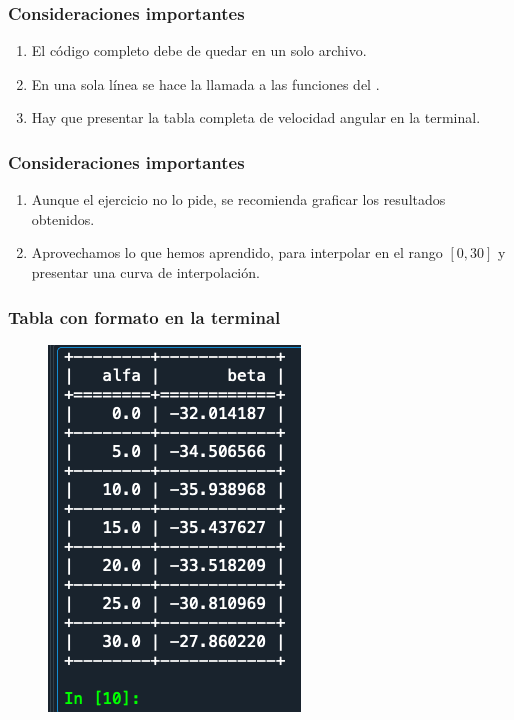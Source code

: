 \documentclass[12pt]{beamer}
\begin{document}
\begin{frame}
\frametitle{Consideraciones importantes}
\begin{enumerate}[<+->]
\conti
\item El código completo debe de quedar en un solo archivo.
\item En una sola línea se hace la llamada a las funciones del .
\item Hay que presentar la tabla completa de velocidad angular en la terminal.
\seti
\end{enumerate}
\end{frame}
\begin{frame}
\frametitle{Consideraciones importantes}
\begin{enumerate}[<+->]
\conti
\item Aunque el ejercicio no lo pide, se recomienda graficar los resultados obtenidos.
\item Aprovechamos lo que hemos aprendido, para interpolar en el rango $[0, 30]$ y presentar una curva de interpolación.
\end{enumerate}
\end{frame}
\begin{frame}
\frametitle{Tabla con formato en la terminal}
\begin{figure}
    \centering
    \includegraphics[scale=0.5]{Imagenes/diferenciacion_ejercicio_segmento_tabla.png}
\end{figure}
\end{frame}
\end{document}
